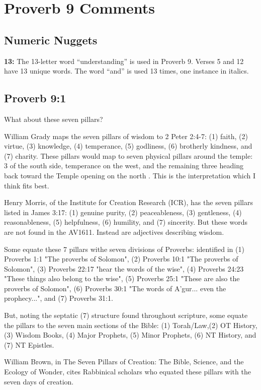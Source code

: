 \section{Proverb 9 Comments}

\subsection{Numeric Nuggets}
\textbf{13:} The 13-letter word ``understanding'' is used in Proverb 9. Verses 5 and 12 have 13 unique words. The word ``and'' is used 13 times, one instance in italics.

\subsection{Proverb 9:1}
What about these seven pillars?
\begin{compactenum}
    \item William Grady maps the seven pillars of wisdom to 2 Peter 2:4-7: (1) faith, (2) virtue, (3) knowledge, (4) temperance, (5) godliness, (6) brotherly kindness, and (7) charity. These pillars would map to seven physical pillars around the temple: 3 of the south side, temperance on the west, and the remaining three heading back toward the Temple opening on the north \cite{grady2010given}. This is the interpretation which I think fits best.
    \item Henry Morris, of the Institute for Creation Research (ICR), has the seven pillars listed in James 3:17:  (1) genuine purity, (2) peaceableness, (3) gentleness, (4) reasonableness, (5) helpfulness, (6) humility, and (7) sincerity. But these words are not found in the AV1611.  Instead are adjectives describing wisdom.
    \item Some equate these 7 pillars withe seven divisions of Proverbs: identified in (1) Proverbs 1:1 "The proverbs of Solomon", (2) Proverbs 10:1 "The proverbs of Solomon", (3) Proverbs 22:17 "hear the words of the wise", (4) Proverbs 24:23 "These things also belong to the wise", (5) Proverbs 25:1 "These are also the proverbs of Solomon", (6) Proverbs 30:1 "The words of A'gur... even the prophecy...", and (7) Proverbs 31:1.
    \item But, noting the septatic (7) structure found throughout scripture, some equate the pillars to the seven main sections of the Bible: (1) Torah/Law,(2) OT History, (3) Wisdom Books, (4) Major Prophets, (5) Minor Prophets, (6) NT History, and (7) NT Epistles.
    \item William Brown, in The Seven Pillars of Creation: The Bible, Science, and the Ecology of Wonder, cites Rabbinical scholars who equated these pillars with the seven days of creation. \cite{brown2010SevenPillars}
\end{compactenum}

